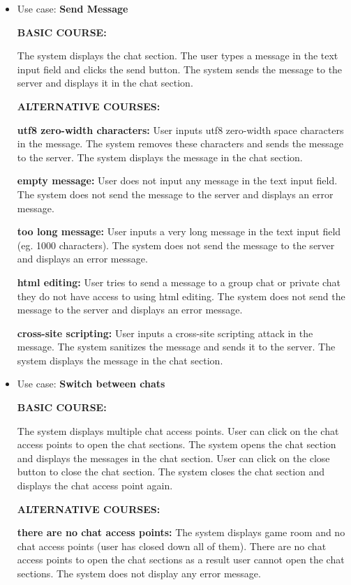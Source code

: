 \documentclass[]{VUMIFTemplateClass}
\begin{document}
\begin{itemize}
    \item 
    Use case: \textbf{Send Message}

    \textbf{BASIC COURSE:}

    The system displays the chat section. The user types a message in the text input field and clicks the send button. The system sends the message to the server and displays it in the chat section.

    \textbf{ALTERNATIVE COURSES:}

    \textbf{utf8 zero-width characters:}
    User inputs utf8 zero-width space characters in the message. The system removes these characters and sends the message to the server. The system displays the message in the chat section.

    \textbf{empty message:}
    User does not input any message in the text input field. The system does not send the message to the server and displays an error message.

    \textbf{too long message:}
    User inputs a very long message in the text input field (eg. 1000 characters). The system does not send the message to the server and displays an error message.

    \textbf{html editing:}
    User tries to send a message to a group chat or private chat they do not have access to using html editing. The system does not send the message to the server and displays an error message.

    \textbf{cross-site scripting:}
    User inputs a cross-site scripting attack in the message. The system sanitizes the message and sends it to the server. The system displays the message in the chat section.

    \item 
    Use case: \textbf{Switch between chats}

    \textbf{BASIC COURSE:}

    The system displays multiple chat access points. User can click on the chat access points to open the chat sections. The system opens the chat section and displays the messages in the chat section. User can click on the close button to close the chat section. The system closes the chat section and displays the chat access point again.

    \textbf{ALTERNATIVE COURSES:}

    \textbf{there are no chat access points:}
    The system displays game room and no chat access points (user has closed down all of them). There are no chat access points to open the chat sections as a result user cannot open the chat sections. The system does not display any error message.

\end{itemize}
\end{document}
